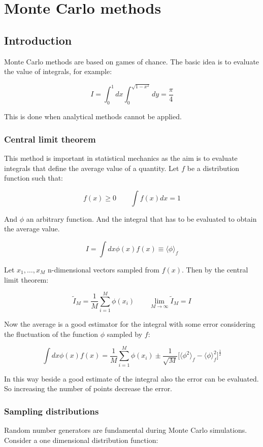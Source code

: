 \graphicspath{{chapters/17/images/}}
\chapter{Monte Carlo methods}

\section{Introduction}
Monte Carlo methods are based on games of chance.
The basic idea is to evaluate the value of integrals, for example:

$$I = \int_0^1dx\int_0^{\sqrt{1-x^2}}dy = \frac{\pi}{4}$$

This is done when analytical methods cannot be applied.

	\subsection{Central limit theorem}
	This method is important in statistical mechanics as the aim is to evaluate integrals that define the average value of a quantity.
	Let $f$ be a distribution function such that:

	$$f(x)\ge 0\qquad \int f(x)dx = 1$$

	And $\phi$ an arbitrary function.
	And the integral that has to be evaluated to obtain the average value.

	$$I = \int dx\phi(x)f(x)\equiv\langle\phi\rangle_f$$

	Let $x_1, \dots, x_M$ n-dimensional vectors sampled from $f(x)$.
	Then by the central limit theorem:

	$$\tilde{I}_M = \frac{1}{M}\sum\limits_{i=1}^M\phi(x_i)\qquad \lim\limits_{M\rightarrow\infty}\tilde{I}_M = I$$

	Now the average is a good estimator for the integral with some error considering the fluctuation of the function $\phi$ sampled by $f$:

	$$\int dx\phi(x)f(x) = \frac{1}{M}\sum\limits_{i=1}^M\phi(x_i)\pm\frac{1}{\sqrt{M}}\bigl[\langle\phi^2\rangle_f-\langle\phi\rangle_f^2\bigr]^{\frac{1}{2}}$$

	In this way beside a good estimate of the integral also the error can be evaluated.
	So increasing the number of points decrease the error.

	\subsection{Sampling distributions}
	Random number generators are fundamental during Monte Carlo simulations.
	Consider a one dimensional distribution function:

